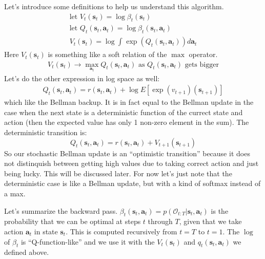 \documentclass{report}
\begin{document}
Let's introduce some definitions to help us understand this algorithm.
\begin{gather}
		\text{let } V_{ t } (\bm{s}_{t}) = \log \beta_{ t } ( \bm{s}_{t})\\
		\text{let } Q_{ t } (\bm{s}_{t}, \bm{a}_{t} ) = \log \beta_{ t } (\bm{s}_{t}, \bm{a}_{t} ) \\
		V_{ t } (\bm{s}_{t}) = \log \int_{}^{} \exp (Q_{ t }(\bm{s}_{t}, \bm{a}_{t} )) d \bm{a}_{t}
\end{gather}
Here $ V_{ t } (\bm{s}_{t})  $ is something like a soft relation of the $ \max  $ operator.
\begin{gather}
		V_{ t } (\bm{s}_{t}) \to \max_{\bm{a}_{t}} Q_{ t } (\bm{s}_{t}, \bm{a}_{t} ) \text{ as } Q_{ t }(\bm{s}_{t}, \bm{a}_{t} ) \text{ gets bigger}
\end{gather}
Let's do the other expression in log space as well:
\begin{gather}
		Q_{ t } (\bm{s}_{t}, \bm{a}_{t} ) = r (\bm{s}_{t}, \bm{a}_{t} ) + 
		\log E \left[ \exp (v_{ t+1 }) (\bm{s}_{t+1}) \right] 
\end{gather}
which like the Bellman backup.
It is in fact equal to the Bellman update in the case when the next state is a deterministic function
of the currect state and action (then the expected value has only 1 non-zero element in the sum).
The deterministic transition is:
\begin{equation}
		Q_{ t } (\bm{s}_{t}, \bm{a}_{t} ) = r (\bm{s}_{t}, \bm{a}_{t} ) + V_{ t+1 } (\bm{s}_{t+1})
\end{equation}
So our stochastic Bellman update is an ``optimistic transition'' because it does not distinquish
between getting high values due to taking correct action and just being lucky.
This will be discussed later.
For now let's just note that the deterministic case is like a Bellman update,
but with a kind of softmax instead of a max.

Let's summarize the backward pass.
$ \beta_{ t } (\bm{s}_{t}, \bm{a}_{t} ) = p (\mathcal{O}_{ t:T }| \bm{s}_{t}, \bm{a}_{t}) $ is the probability that we can be optimal at steps $ t  $
through $ T  $, given that we take action $ \bm{a}_{t}  $ in state $ \bm{s}_{t}  $.
This is computed recursively from $ t=T  $ to $ t=1  $.
The $ \log  $ of $ \beta_{ t }  $ is ``Q-function-like'' and we use it with the $ V_{ t } (\bm{s}_{t})  $ and $ q_{ t } (\bm{s}_{t}, \bm{a}_{t} )  $ we defined above.
\end{document}
